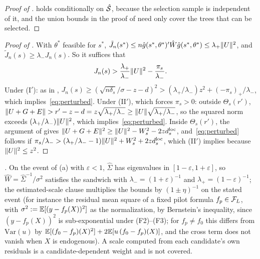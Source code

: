 \begin{proof}[Proof of ]
 holds conditionally on $\hat{\mathcal{S}}$, because the selection sample is independent of it, and the union bounds in the proof of  need only cover the trees that can be selected.
\end{proof}

\begin{proof}[Proof of ]
With $\theta^*$ feasible for $s^*$, $\tilde J_n(s^*) \le n\hat g(s^*,\theta^*)'\hat W\hat g(s^*,\theta^*) \le \lambda_+\lVert U\rVert^2$, and $\tilde J_n(s) \ge \lambda_-J_n(s)$. So it suffices that
\begin{equation}
J_n(s) > \frac{\lambda_+}{\lambda_-}\lVert U\rVert^2 - \frac{\pi_s}{\lambda_-}.
\label{eq:perturbed}
\end{equation}
Under (I$'$): as in , $J_n(s) \ge (\sqrt{n\delta_s}/\sigma - z - d)^2 > (\lambda_+/\lambda_-)z^2 + (-\pi_s)_+/\lambda_-$, which implies~\eqref{eq:perturbed}. Under (II$'$), which forces $\pi_s > 0$: outside $\Theta_s(r')$, $\lVert U + G + E\rVert > r' - z - d = z\sqrt{\lambda_+/\lambda_-} \ge \lVert U\rVert\sqrt{\lambda_+/\lambda_-}$, so the squared norm exceeds $(\lambda_+/\lambda_-)\lVert U\rVert^2$, which implies~\eqref{eq:perturbed}. Inside $\Theta_s(r')$, the argument of  gives $\lVert U + G + E\rVert^2 \ge \lVert U\rVert^2 - W_s^2 - 2zd^{\mathrm{loc}}_s$, and~\eqref{eq:perturbed} follows if $\pi_s/\lambda_- > (\lambda_+/\lambda_- - 1)\lVert U\rVert^2 + W_s^2 + 2zd^{\mathrm{loc}}_s$, which (II$'$) implies because $\lVert U\rVert^2 \le z^2$.
\end{proof}

\medskip\noindent\emph{.} On the event of (a) with $\varepsilon < 1$, $\hat\Sigma$ has eigenvalues in $[1 - \varepsilon, 1 + \varepsilon]$, so $\hat W = \hat\Sigma^{-1}/\sigma^2$ satisfies the sandwich with $\lambda_- = (1 + \varepsilon)^{-1}$ and $\lambda_+ = (1 - \varepsilon)^{-1}$; the estimated-scale clause multiplies the bounds by $(1 \pm \eta)^{-1}$ on the stated event (for instance the residual mean square of a fixed pilot formula $f_p \in \mathcal{F}_L$, with $\sigma^2 := \mathbb{E}[(y - f_p(X))^2]$ as the normalization, by Bernstein's inequality, since $(y - f_p(X))^2$ is sub-exponential under (F2)--(F3); for $f_p \ne f_0$ this differs from $\mathrm{Var}(u)$ by $\mathbb{E}[(f_0 - f_p)(X)^2] + 2\mathbb{E}[u\,(f_0 - f_p)(X)]$, and the cross term does not vanish when $X$ is endogenous). A scale computed from each candidate's own residuals is a candidate-dependent weight and is not covered.

